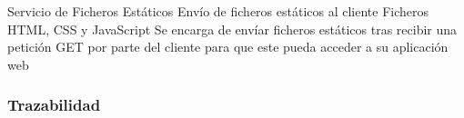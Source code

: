 \begin{component}{Servicio de Ficheros Estáticos}
{Envío de ficheros estáticos al cliente}
{\NA}
{Ficheros HTML, CSS y JavaScript}
{\NA} %
{Se encarga de envíar ficheros estáticos tras recibir una petición GET por parte del cliente para que este pueda acceder a su aplicación web}
\end{component}

\FloatBarrier

\subsubsection{Trazabilidad} {\label{subsubsec:trazabilidad-comp}}

\begin{table}[htb]
      {\traceabilityCompFN}
  \end{table}

